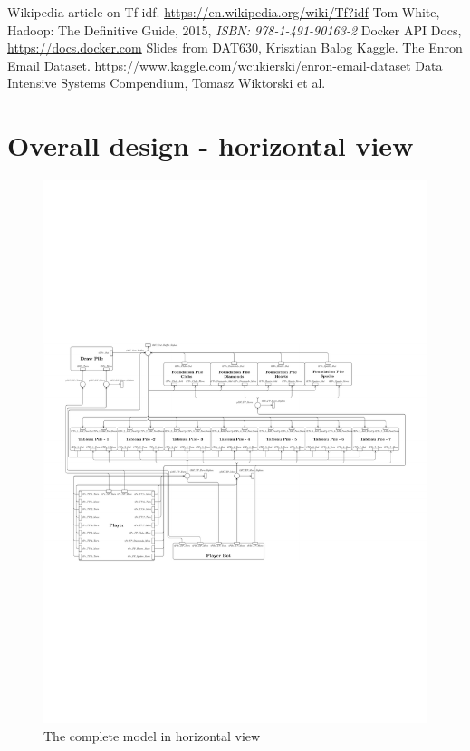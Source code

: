 \documentclass[runningheads,a4paper]{llncs}
\begin{document}
\begin{thebibliography}{6}

 Wikipedia article on Tf-idf. \url{https://en.wikipedia.org/wiki/Tf?idf}
 Tom White, Hadoop: The Definitive Guide, 2015, \emph{ISBN: 978-1-491-90163-2}
 Docker API Docs, \url{https://docs.docker.com}
 Slides from DAT630, Krisztian Balog
 Kaggle. The Enron Email Dataset. \url{https://www.kaggle.com/wcukierski/enron-email-dataset}
 Data Intensive Systems Compendium, Tomasz Wiktorski et al.

\end{thebibliography}
\appendix
\section{Overall design - horizontal view}
\begin{figure}
	\includegraphics[trim=40 100 100 310,angle=90,scale=1.4]{images/overallViewPdf}
	\caption{The complete model in horizontal view}
	\label{fig:full_vertical}
\end{figure}
\clearpage
\end{document}
